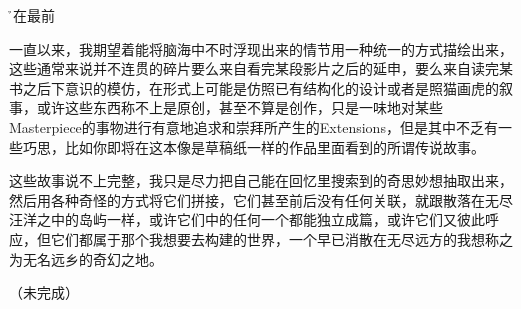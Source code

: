 \h*{写在最前}

一直以来，我期望着能将脑海中不时浮现出来的情节用一种统一的方式描绘出来，这些通常来说并不连贯的碎片要么来自看完某段影片之后的延申，要么来自读完某书之后下意识的模仿，在形式上可能是仿照已有结构化的设计或者是照猫画虎的叙事，或许这些东西称不上是原创，甚至不算是创作，只是一味地对某些Masterpiece的事物进行有意地追求和崇拜所产生的Extensions，但是其中不乏有一些巧思，比如你即将在这本像是草稿纸一样的作品里面看到的所谓传说故事。

这些故事说不上完整，我只是尽力把自己能在回忆里搜索到的奇思妙想抽取出来，然后用各种奇怪的方式将它们拼接，它们甚至前后没有任何关联，就跟散落在无尽汪洋之中的岛屿一样，或许它们中的任何一个都能独立成篇，或许它们又彼此呼应，但它们都属于那个我想要去构建的世界，一个早已消散在无尽远方的我想称之为无名远乡的奇幻之地。

（未完成）